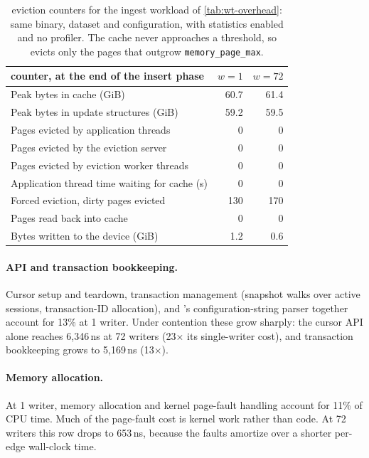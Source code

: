 \begin{table}[h]
  \centering
  \begin{tabularx}{\columnwidth}{@{}Xrr@{}}
    \toprule
    \wt{} counter, at the end of the insert phase & $w=1$ & $w=72$ \\
    \midrule
    Peak bytes in cache (GiB)                      & 60.7 & 61.4 \\
    Peak bytes in update structures (GiB)          & 59.2 & 59.5 \\
    Pages evicted by application threads           & 0 & 0 \\
    Pages evicted by the eviction server           & 0 & 0 \\
    Pages evicted by eviction worker threads       & 0 & 0 \\
    Application thread time waiting for cache (s)  & 0 & 0 \\
    Forced eviction, dirty pages evicted           & 130 & 170 \\
    Pages read back into cache                     & 0 & 0 \\
    Bytes written to the device (GiB)              & 1.2 & 0.6 \\
    \bottomrule
  \end{tabularx}
  \caption{\wt{} eviction counters for the ingest workload of \autoref{tab:wt-overhead}:
  same binary, dataset and configuration, with statistics enabled and no profiler.
  The cache never approaches a threshold, so \wt{} evicts only the pages that outgrow
  \texttt{memory\_page\_max}.}
  \label{tab:wt-eviction-counters}
\end{table}

\paragraph{API and transaction bookkeeping.}
Cursor setup and teardown, transaction management (snapshot walks over active sessions, transaction-ID allocation), and \wt{}'s configuration-string parser together account for 13\% at 1 writer.
Under contention these grow sharply: the cursor API alone reaches 6,346\,ns at 72 writers (23$\times$ its single-writer cost), and transaction bookkeeping grows to 5,169\,ns (13$\times$).

\paragraph{Memory allocation.}
At 1 writer, memory allocation and kernel page-fault handling account for 11\% of CPU time.
Much of the page-fault cost is kernel work rather than \wt{} code.
At 72 writers this row drops to 653\,ns, because the faults amortize over a shorter per-edge wall-clock time.

